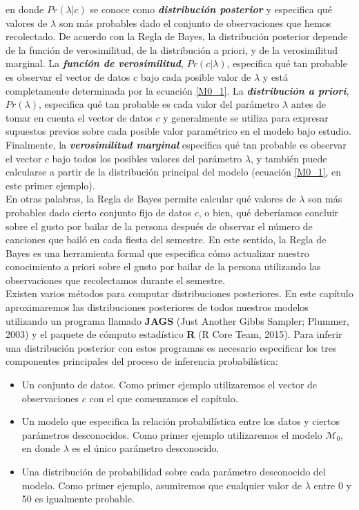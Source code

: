 \documentclass{article}
\begin{document}
\noindent en donde $Pr(\lambda|c)$ se conoce como \emph{\textbf{distribución posterior}} y especifica qué valores de $\lambda$ son más probables dado el conjunto de observaciones que hemos recolectado. De acuerdo con la Regla de Bayes, la distribución posterior depende de la función de verosimilitud, de la distribución  a priori, y de la verosimilitud marginal. La \emph{\textbf{función de verosimilitud}}, $Pr(c|\lambda)$, especifica qué tan probable es observar el vector de datos $c$ bajo cada posible valor de $\lambda$ y está completamente determinada por la ecuación \eqref{M0_1}. La \emph{\textbf{distribución a priori}}, $Pr(\lambda)$, especifica qué tan probable es cada valor del parámetro $\lambda$ antes de tomar en cuenta el vector de datos $c$ y generalmente se utiliza para expresar supuestos previos sobre cada posible valor paramétrico en el modelo bajo estudio. Finalmente, la \emph{\textbf{verosimilitud marginal}} especifica qué tan probable es observar el vector $c$ bajo todos los posibles valores del parámetro $\lambda$, y también puede calcularse a partir de la distribución principal del modelo (ecuación \eqref{M0_1}, en este primer ejemplo). \\
\indent En otras palabras, la Regla de Bayes permite calcular qué valores de $\lambda$ son más probables dado cierto conjunto fijo de datos $c$, o bien, qué deberíamos concluir sobre el gusto por bailar de la persona después de observar el número de canciones que bailó en cada fiesta del semestre. En este sentido, la Regla de Bayes es una herramienta formal que especifica cómo actualizar nuestro conocimiento a priori sobre el gusto por bailar de la persona utilizando las observaciones que recolectamos durante el semestre.\\
\indent Existen varios métodos para computar distribuciones posteriores. En este capítulo aproximaremos las distribuciones posteriores de todos nuestros modelos utilizando un programa llamado \textbf{JAGS} (Just Another Gibbs Sampler; Plummer, 2003) y el paquete de cómputo estadístico \textbf{R} (R Core Team, 2015). Para inferir una distribución posterior con estos programas es necesario especificar los tres componentes principales del proceso de inferencia probabilística:
\begin{itemize}
\item{Un conjunto de datos. Como primer ejemplo utilizaremos el vector de observaciones $c$ con el que comenzamos el capítulo.}
\item{Un modelo que especifica la relación probabilística entre los datos y ciertos parámetros desconocidos. Como primer ejemplo utilizaremos el modelo $\mathcal M_0$, en donde $\lambda$ es el único parámetro desconocido.}
\item{Una distribución de probabilidad sobre cada parámetro desconocido del modelo. Como primer ejemplo, asumiremos que cualquier valor de $\lambda$ entre 0 y 50 es igualmente probable.}
\end{itemize}
\end{document}
